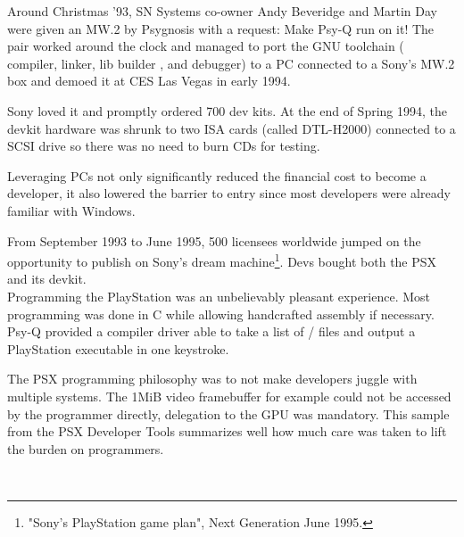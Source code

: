 \vspace{-10pt}
\begin{figure}{
\centering {}}
\end{figure}
Around Christmas '93, SN Systems co-owner Andy Beveridge and Martin Day were given an MW.2 by Psygnosis with a request: Make Psy-Q run on it! The pair worked around the clock and managed to port the GNU toolchain ( compiler,  linker, lib builder , and  debugger) to a PC connected to a Sony's MW.2 box and demoed it at CES Las Vegas in early 1994.\\
\par
 Sony loved it and promptly ordered 700 dev kits. At the end of Spring 1994, the devkit hardware was shrunk to two ISA cards (called DTL-H2000) connected to a SCSI drive so there was no need to burn CDs for testing.\\
\vspace{5pt}
\vspace{-10pt}
\par
Leveraging PCs not only significantly reduced the financial cost to become a developer, it also lowered the barrier to entry since most developers were already familiar with Windows.\\
\par
From September 1993 to June 1995, 500 licensees worldwide jumped on the opportunity to publish on Sony's dream machine\footnote{"Sony's PlayStation game plan", Next Generation June 1995.}. Devs bought both the PSX and its devkit.\\
Programming the PlayStation was an unbelievably pleasant experience. Most programming was done in C while allowing handcrafted assembly if necessary. Psy-Q provided a compiler driver able to take a list of / files and output a PlayStation executable in one keystroke.\\
\par
The PSX programming philosophy was to not make developers juggle with multiple systems. The 1MiB video framebuffer for example could not be accessed by the programmer directly, delegation to the GPU was mandatory. This sample from the PSX Developer Tools summarizes well how much care was taken to lift the burden on programmers.\\
\par
{}\\
\par
{}
\par









